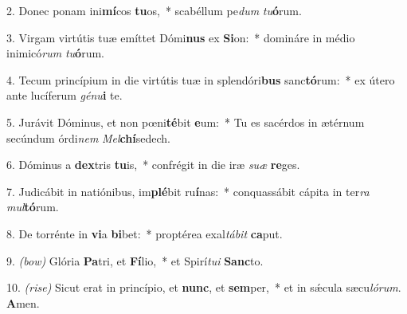 2. Donec ponam ini\textbf{mí}cos \textbf{tu}os,~*
	scabéllum pe\textit{dum} \textit{tu}\textbf{ó}rum.

3. Virgam virtútis tuæ emíttet Dómi\textbf{nus} ex \textbf{Si}on:~*
	domináre in médio inimicó\textit{rum} \textit{tu}\textbf{ó}rum.

4. Tecum princípium in die virtútis tuæ in splendóri\textbf{bus} sanc\textbf{tó}rum:~*
	ex útero ante lucíferum \textit{gé}\textit{nu}\textbf{i} te.

5. Jurávit Dóminus, et non p{\oe}ni\textbf{té}\-bit \textbf{e}um:~*
	Tu es sacérdos in ætérnum secúndum órdi\textit{nem} \textit{Mel}\textbf{chí}se\-dech.

6. Dóminus a \textbf{dex}tris \textbf{tu}is,~*
	confrégit in die iræ \textit{su}\textit{æ} \textbf{re}ges.

7. Judicábit in natiónibus, im\textbf{plé}bit ru\textbf{í}nas:~*
	conquassábit cápita in ter\textit{ra} \textit{mul}\textbf{tó}rum.

8. De torrénte in \textbf{vi}a \textbf{bi}bet:~*
	proptérea exal\textit{tá}\textit{bit} \textbf{ca}put.

9. {\color{red}\textit{(bow)}} Glória \textbf{Pa}tri, et \textbf{Fí}lio,~*
	et Spirí\textit{tu}\textit{i} \textbf{Sanc}to.

10. {\color{red}\textit{(rise)}} Sicut erat in princípio, et \textbf{nunc}, et \textbf{sem}per,~*
	et in s\'{\ae}cula sæcu\textit{ló}\textit{rum}. \textbf{A}men.